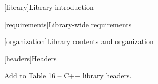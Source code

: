 
[library]{Library introduction}

\setcounter{section}{4}

[requirements]{Library-wide requirements}

[organization]{Library contents and organization}

\setcounter{subsubsection}{1}

[headers]{Headers}

Add  to Table 16 -- C++ library headers.
